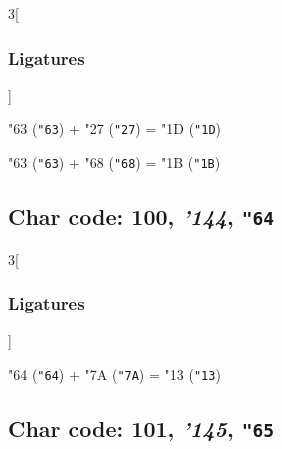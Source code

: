 \documentclass{article}
\newlength{\maxcharwidth}
\begin{document}

\begin{multicols}{3}[\subsubsection{Ligatures}]

{\testfont\char"63\noboundary} ({\tt"63}) + {\testfont\char"27\noboundary} ({\tt"27}) = {\testfont\char"1D\noboundary} ({\tt"1D}) 

{\testfont\char"63\noboundary} ({\tt"63}) + {\testfont\char"68\noboundary} ({\tt"68}) = {\testfont\char"1B\noboundary} ({\tt"1B}) 

\end{multicols}

\subsection{Char code: 100, {\it'144}, {\tt"64}}
\label{char_100}


\begin{multicols}{3}[\subsubsection{Ligatures}]

{\testfont\char"64\noboundary} ({\tt"64}) + {\testfont\char"7A\noboundary} ({\tt"7A}) = {\testfont\char"13\noboundary} ({\tt"13}) 

\end{multicols}

\subsection{Char code: 101, {\it'145}, {\tt"65}}
\label{char_101}
\end{document}
